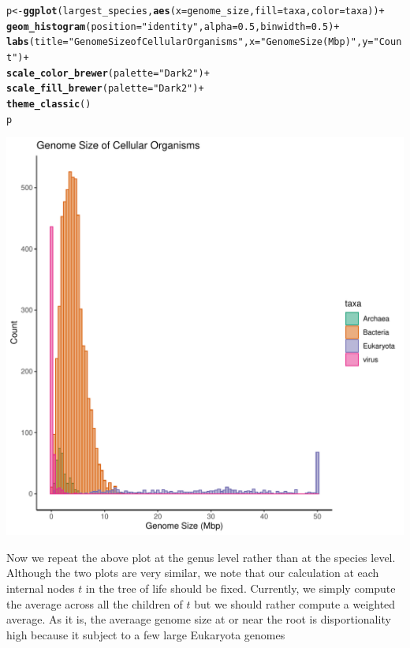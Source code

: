 \documentclass{article}\usepackage[]{graphicx}\usepackage[]{color}
\makeatletter
\def\maxwidth{ %
  \ifdim\Gin@nat@width>\linewidth
    \linewidth
  \else
    \Gin@nat@width
  \fi
}
\newcommand{\hlnum}[1]{\textcolor[rgb]{0.686,0.059,0.569}{#1}}%
\newcommand{\hlstr}[1]{\textcolor[rgb]{0.192,0.494,0.8}{#1}}%
\newcommand{\hlopt}[1]{\textcolor[rgb]{0,0,0}{#1}}%
\newcommand{\hlstd}[1]{\textcolor[rgb]{0.345,0.345,0.345}{#1}}%
\newcommand{\hlkwb}[1]{\textcolor[rgb]{0.69,0.353,0.396}{#1}}%
\newcommand{\hlkwc}[1]{\textcolor[rgb]{0.333,0.667,0.333}{#1}}%
\newcommand{\hlkwd}[1]{\textcolor[rgb]{0.737,0.353,0.396}{\textbf{#1}}}%
\newenvironment{kframe}{%
 \def\at@end@of@kframe{}%
 \ifinner\ifhmode%
  \def\at@end@of@kframe{\end{minipage}}%
  \begin{minipage}{\columnwidth}%
 \fi\fi%
 \def\FrameCommand##1{\hskip\@totalleftmargin \hskip-\fboxsep
 \colorbox{shadecolor}{##1}\hskip-\fboxsep
     \hskip-\linewidth \hskip-\@totalleftmargin \hskip\columnwidth}%
 \MakeFramed {\advance\hsize-\width
   \@totalleftmargin\z@ \linewidth\hsize
   \@setminipage}}%
 {\par\unskip\endMakeFramed%
 \at@end@of@kframe}
\newenvironment{knitrout}{}{} %
\makeatother
\begin{document}
\begin{knitrout}
\begin{kframe}
\begin{alltt}
\hlstd{p}\hlkwb{<-}\hlkwd{ggplot}\hlstd{(largest_species,} \hlkwd{aes}\hlstd{(}\hlkwc{x}\hlstd{=genome_size,} \hlkwc{fill}\hlstd{=taxa,} \hlkwc{color}\hlstd{=taxa))} \hlopt{+}
  \hlkwd{geom_histogram}\hlstd{(}\hlkwc{position}\hlstd{=}\hlstr{"identity"}\hlstd{,} \hlkwc{alpha}\hlstd{=}\hlnum{0.5}\hlstd{,} \hlkwc{binwidth} \hlstd{=} \hlnum{0.5}\hlstd{)} \hlopt{+}
  \hlkwd{labs}\hlstd{(}\hlkwc{title}\hlstd{=}\hlstr{"Genome Size of Cellular Organisms"} \hlstd{,}\hlkwc{x}\hlstd{=}\hlstr{"Genome Size (Mbp)"}\hlstd{,} \hlkwc{y} \hlstd{=} \hlstr{"Count"}\hlstd{)}\hlopt{+}
  \hlkwd{scale_color_brewer}\hlstd{(}\hlkwc{palette}\hlstd{=}\hlstr{"Dark2"}\hlstd{)}\hlopt{+}
  \hlkwd{scale_fill_brewer}\hlstd{(}\hlkwc{palette}\hlstd{=}\hlstr{"Dark2"}\hlstd{)}\hlopt{+}
  \hlkwd{theme_classic}\hlstd{()}
\hlstd{p}
\end{alltt}
\end{kframe}
\includegraphics[width=\maxwidth]{figure/unnamed-chunk-8-1} 

\end{knitrout}

Now we repeat the above plot at the genus level rather than at the species level.
Although the two plots are very similar, we note that our calculation at each internal
nodes $t$ in the tree of life should be fixed.
Currently, we simply compute the average across all the children of $t$
but we should rather compute a weighted average.
As it is, the averaage genome size at or near the root is disportionality high because it
subject to a few large Eukaryota genomes
\end{document}
